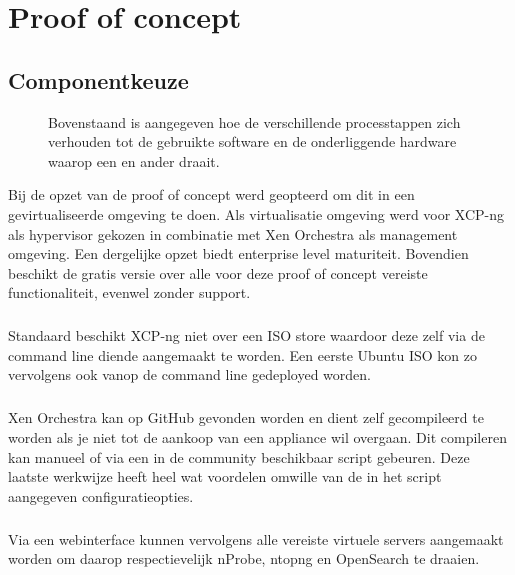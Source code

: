 \chapter{Proof of concept}

\section{Componentkeuze}

\begin{figure}[H]
    
    \caption[short description]{Bovenstaand is aangegeven hoe de verschillende processtappen zich verhouden tot de gebruikte software en de onderliggende hardware waarop een en ander draait.}
    \label{fig:Componentkeuze}
\end{figure}

Bij de opzet van de proof of concept werd geopteerd om dit in een gevirtualiseerde omgeving te doen. Als virtualisatie omgeving werd voor XCP-ng als hypervisor gekozen in combinatie met Xen Orchestra als management omgeving. Een dergelijke opzet biedt enterprise level maturiteit. Bovendien beschikt de gratis versie over alle voor deze proof of concept vereiste functionaliteit, evenwel zonder support.

\paragraph{}
Standaard beschikt XCP-ng niet over een ISO store waardoor deze zelf via de command line diende aangemaakt te worden. Een eerste Ubuntu ISO kon zo vervolgens ook vanop de command line gedeployed worden.

\paragraph{}
Xen Orchestra kan op GitHub gevonden worden en dient zelf gecompileerd te worden als je niet tot de aankoop van een appliance wil overgaan. Dit compileren kan manueel of via een in de community beschikbaar script gebeuren. Deze laatste werkwijze heeft heel wat voordelen omwille van de in het script aangegeven configuratieopties.

\paragraph{}
Via een webinterface kunnen vervolgens alle vereiste virtuele servers aangemaakt worden om daarop respectievelijk nProbe, ntopng en OpenSearch te draaien.


